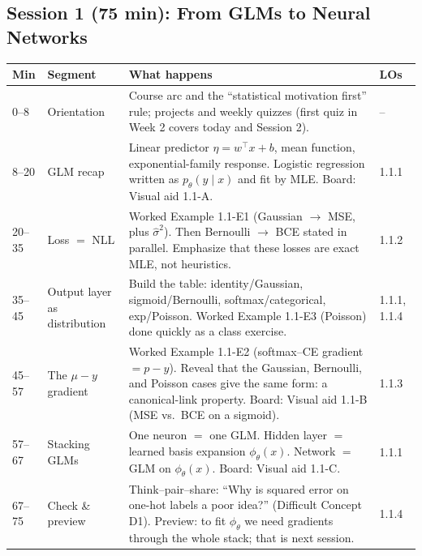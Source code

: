 \documentclass[11pt]{article}
\begin{document}
\subsection*{Session 1 (75 min): From GLMs to Neural Networks}
\begin{longtable}{@{}p{1.4cm}p{3.2cm}p{8.9cm}p{1.6cm}@{}}
\toprule
\textbf{Min} & \textbf{Segment} & \textbf{What happens} & \textbf{LOs} \\
\midrule
\endhead
0--8 & Orientation & Course arc and the ``statistical motivation first'' rule; projects and weekly quizzes (first quiz in Week 2 covers today and Session 2). & -- \\
8--20 & GLM recap & Linear predictor $\eta = w^\top x + b$, mean function, exponential-family response. Logistic regression written as $p_\theta(y\mid x)$ and fit by MLE. Board: Visual aid 1.1-A. & 1.1.1 \\
20--35 & Loss $=$ NLL & Worked Example 1.1-E1 (Gaussian $\to$ MSE, plus $\hat\sigma^2$). Then Bernoulli $\to$ BCE stated in parallel. Emphasize that these losses are exact MLE, not heuristics. & 1.1.2 \\
35--45 & Output layer as distribution & Build the table: identity/Gaussian, sigmoid/Bernoulli, softmax/categorical, exp/Poisson. Worked Example 1.1-E3 (Poisson) done quickly as a class exercise. & 1.1.1, 1.1.4 \\
45--57 & The $\mu - y$ gradient & Worked Example 1.1-E2 (softmax--CE gradient $= p - y$). Reveal that the Gaussian, Bernoulli, and Poisson cases give the same form: a canonical-link property. Board: Visual aid 1.1-B (MSE vs.\ BCE on a sigmoid). & 1.1.3 \\
57--67 & Stacking GLMs & One neuron $=$ one GLM. Hidden layer $=$ learned basis expansion $\phi_\theta(x)$. Network $=$ GLM on $\phi_\theta(x)$. Board: Visual aid 1.1-C. & 1.1.1 \\
67--75 & Check \& preview & Think--pair--share: ``Why is squared error on one-hot labels a poor idea?'' (Difficult Concept D1). Preview: to fit $\phi_\theta$ we need gradients through the whole stack; that is next session. & 1.1.4 \\
\bottomrule
\end{longtable}
\end{document}
